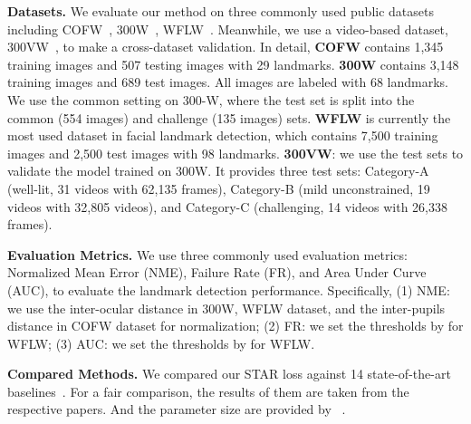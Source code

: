 \documentclass[10pt,twocolumn,letterpaper]{article}
\begin{document}
\noindent\textbf{Datasets.}
We evaluate our method on three commonly used public datasets including COFW~\cite{burgos2013robust}, 300W~\cite{sagonas2013300}, WFLW~\cite{wu2018lab}.
Meanwhile, we use a video-based dataset, 300VW~\cite{300vw-1,300vw-2,300VW-3}, to make a cross-dataset validation. In detail, 
\textbf{COFW} contains 1,345 training images and 507 testing images with 29 landmarks.
\textbf{300W} contains 3,148 training images and 689 test images.
All images are labeled with 68 landmarks.
We use the common setting on 300-W, where the test set is split into the common (554 images) and challenge (135 images) sets. 
\textbf{WFLW} is currently the most used dataset in facial landmark detection, which contains 7,500 training images and 2,500 test images with 98 landmarks.
\textbf{300VW}: we use the test sets to validate the model trained on 300W. 
It provides three test sets: Category-A (well-lit, 31 videos with 62,135 frames), Category-B (mild unconstrained, 19 videos with 32,805 videos), and Category-C (challenging, 14 videos with 26,338 frames).

\noindent\textbf{Evaluation Metrics.}
We use three commonly used evaluation metrics: Normalized Mean Error (NME), Failure Rate (FR), and Area Under Curve (AUC), to evaluate the landmark detection performance. 
Specifically, (1) NME: we use the inter-ocular distance in 300W, WFLW dataset, and the inter-pupils distance in COFW dataset for normalization; 
(2) FR: we set the thresholds by  for WFLW; 
(3) AUC: we set the thresholds by  for WFLW.

\noindent\textbf{Compared Methods.}
We compared our STAR loss against 14 state-of-the-art baselines~\cite{wu2018lab, feng2018wing, dapogny2019decafa, hrnet, wang2019awing, qian2019avs, li20DAG,kumar2020luvli,huang2021adnet,lan2021hih,JLS21pipnet,SLPT,li2022DTLD,li2022repformer}. For a fair comparison, the results of them are taken from the respective papers.
And the parameter size are provided by ~\cite{lan2021hih, JLS21pipnet, SLPT, li2022DTLD}.
\end{document}
